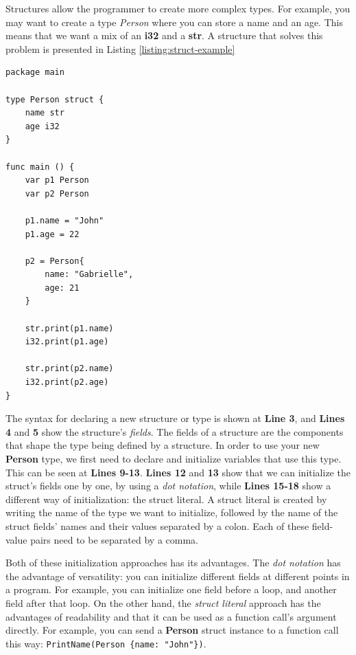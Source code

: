 \documentclass[11pt,fleqn,openany]{book} %
\begin{document}
Structures allow the programmer to create more complex types. For example, you may want to create a type \emph{Person} where you can store a name and an age. This means that we want a mix of an \textbf{i32} and a \textbf{str}. A structure that solves this problem is presented in Listing \ref{listing:struct-example}

\begin{lstlisting}[caption={Type $Person$ using Structures},captionpos=b,label={listing:struct-example}]
package main

type Person struct {
	name str
    age i32
}

func main () {
    var p1 Person
    var p2 Person
    
    p1.name = "John"
    p1.age = 22
    
    p2 = Person{
        name: "Gabrielle",
        age: 21
    }
    
    str.print(p1.name)
    i32.print(p1.age)
    
    str.print(p2.name)
    i32.print(p2.age)
}
\end{lstlisting}

The syntax for declaring a new structure or type is shown at \textbf{Line 3}, and \textbf{Lines 4} and \textbf{5} show the structure's \emph{fields}. The fields of a structure are the components that shape the type being defined by a structure. In order to use your new \textbf{Person} type, we first need to declare and initialize variables that use this type. This can be seen at \textbf{Lines 9-13}. \textbf{Lines 12} and \textbf{13} show that we can initialize the struct's fields one by one, by using a \emph{dot notation}, while \textbf{Lines 15-18} show a different way of initialization: the struct literal. A struct literal is created by writing the name of the type we want to initialize, followed by the name of the struct fields' names and their values separated by a colon. Each of these field-value pairs need to be separated by a comma.

Both of these initialization approaches has its advantages. The \emph{dot notation} has the advantage of versatility: you can initialize different fields at different points in a program. For example, you can initialize one field before a loop, and another field after that loop. On the other hand, the \emph{struct literal} approach has the advantages of readability and that it can be used as a function call's argument directly. For example, you can send a \textbf{Person} struct instance to a function call this way: \lstinline|PrintName(Person {name: "John"})|.
\end{document}
